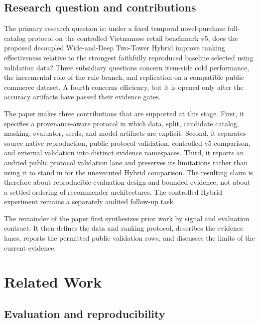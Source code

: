 \subsection{Research question and contributions}

The primary research question is: under a fixed temporal novel-purchase
full-catalog protocol on the controlled Vietnamese retail benchmark v5, does
the proposed decoupled Wide-and-Deep Two-Tower Hybrid improve ranking
effectiveness relative to the strongest faithfully reproduced baseline selected
using validation data? Three subsidiary questions concern item-side cold
performance, the incremental role of the rule branch, and replication on a
compatible public commerce dataset. A fourth concerns efficiency, but it is
opened only after the accuracy artifacts have passed their evidence gates.

The paper makes three contributions that are supported at this stage. First, it
specifies a provenance-aware protocol in which data, split, candidate catalog,
masking, evaluator, seeds, and model artifacts are explicit. Second, it separates
source-native reproduction, public protocol validation, controlled-v5 comparison,
and external validation into distinct evidence namespaces. Third, it reports an
audited public protocol validation lane and preserves its limitations rather
than using it to stand in for the unexecuted Hybrid comparison. The resulting
claim is therefore about reproducible evaluation design and bounded evidence,
not about a settled ordering of recommender architectures. The controlled
Hybrid experiment remains a separately audited follow-up task.

The remainder of the paper first synthesizes prior work by signal and evaluation
contract. It then defines the data and ranking protocol, describes the evidence
lanes, reports the permitted public validation rows, and discusses the limits of
the current evidence.

\section{Related Work}

\subsection{Evaluation and reproducibility}

